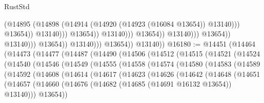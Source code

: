 \begin{lexlean}{RustStd}
\begin{coremodule}
                                                            (@14895
                                                              (@14898
                                                                (@14914
                                                                  (@14920
                                                                    (@14923 (@16084 @13654))
                                                                    @13140)))
                                                              @13654))
                                                          @13140)))
                                                    @13654))
                                                @13140)))
                                          @13654))
                                      @13140)))
                                @13654))
                            @13140)))
                      @13654))
                  @13140)))
            @13654))
        @13140))
@16180 := @14451
    (@14464
      (@14473
        (@14477
          (@14487
            (@14490
              (@14506
                (@14512
                  (@14515
                    (@14521
                      (@14524
                        (@14540
                          (@14546
                            (@14549
                              (@14555
                                (@14558
                                  (@14574
                                    (@14580
                                      (@14583
                                        (@14589
                                          (@14592
                                            (@14608
                                              (@14614
                                                (@14617
                                                  (@14623
                                                    (@14626
                                                      (@14642
                                                        (@14648
                                                          (@14651
                                                            (@14657
                                                              (@14660
                                                                (@14676
                                                                  (@14682
                                                                    (@14685 (@14691 @16132 @13654))
                                                                    @13140)))
                                                              @13654))

\end{coremodule}
\end{lexlean}

